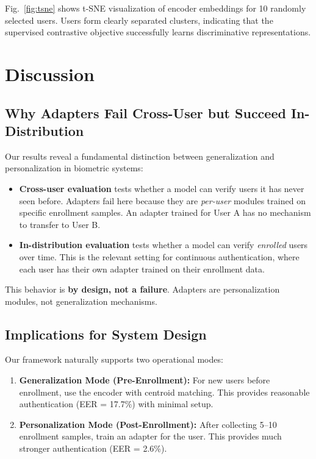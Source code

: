 \documentclass{ieeeaccess}
\begin{document}
{Fig.~\ref{fig:tsne} shows t-SNE visualization of encoder embeddings for 10 randomly selected users. Users form clearly separated clusters, indicating that the supervised contrastive objective successfully learns discriminative representations.

\section{Discussion}
\label{sec:discussion}

\subsection{Why Adapters Fail Cross-User but Succeed In-Distribution}

Our results reveal a fundamental distinction between generalization and personalization in biometric systems:

\begin{itemize}
\item \textbf{Cross-user evaluation} tests whether a model can verify users it has never seen before. Adapters fail here because they are \textit{per-user} modules trained on specific enrollment samples. An adapter trained for User A has no mechanism to transfer to User B.

\item \textbf{In-distribution evaluation} tests whether a model can verify \textit{enrolled} users over time. This is the relevant setting for continuous authentication, where each user has their own adapter trained on their enrollment data.
\end{itemize}

This behavior is \textbf{by design, not a failure}. Adapters are personalization modules, not generalization mechanisms.

\subsection{Implications for System Design}

Our framework naturally supports two operational modes:

\begin{enumerate}
\item \textbf{Generalization Mode (Pre-Enrollment):} For new users before enrollment, use the encoder with centroid matching. This provides reasonable authentication (EER = 17.7\%) with minimal setup.

\item \textbf{Personalization Mode (Post-Enrollment):} After collecting 5--10 enrollment samples, train an adapter for the user. This provides much stronger authentication (EER = 2.6\%).
\end{enumerate}

}
\end{document}
